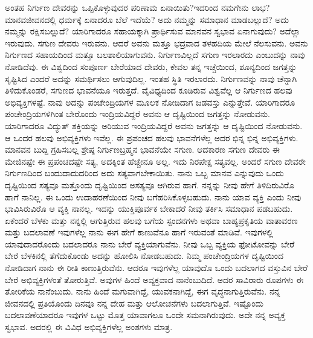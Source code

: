ಅಂತಹ ನಿರ್ಗುಣ ದೇವರನ್ನು ಒಪ್ಪಿಕೊಳ್ಳುವುದರ ಪರಿಣಾಮ ಏನಾಯಿತು?\break ಇದರಿಂದ ನಮಗೇನು ಲಾಭ? ಮಾನವಜೀವನದಲ್ಲಿ ಧರ್ಮಕ್ಕೆ ಏನಾದರೂ ಬೆಲೆ ಇದೆಯೆ? ಅದು ನಮ್ಮನ್ನು ಸಮಾಧಾನ ಮಾಡಬಲ್ಲುದೆ? ಅದು ನಮ್ಮನ್ನು ರಕ್ಷಿಸಬಲ್ಲುದೆ? ಯಾರಿಗಾದರೂ ಸಹಾಯಕ್ಕಾಗಿ ಪ್ರಾರ್ಥಿಸುವ ಮಾನವನ ಸ್ವಭಾವ ಏನಾಗುವುದು? ಅದೆಲ್ಲಾ ಇರುವುದು. ಸಗುಣ ದೇವರು ಇರುವನು. ಆದರೆ ಅವನು ಮತ್ತೂ ಭದ್ರವಾದ ತಳಹದಿಯ ಮೇಲೆ ನೆಲಸುವನು. ಅವನು ನಿರ್ಗುಣದ ಸಹಾಯದಿಂದ ಮತ್ತೂ ಬಲಶಾಲಿಯಾಗುವನು. ನಿರ್ಗುಣವಿಲ್ಲದೆ ಸಗುಣ ಇರಲಾರದು ಎಂಬುದನ್ನು ನಾವು ನೋಡಿದೆವು. ಈ ವಿಶ್ವದಿಂದ ಸಂಪೂರ್ಣ ಬೇರೆಯಾದ ದೇವರು, ಕೇವಲ ತನ್ನ ಇಚ್ಚೆಯಿಂದ, ಶೂನ್ಯದಿಂದ ಜಗತ್ತನ್ನು ಸೃಷ್ಟಿಸಿದ ಎಂದರೆ ಅದನ್ನು ಸಮರ್ಥಿಸಲು ಆಗುವುದಿಲ್ಲ. ಇಂತಹ ಸ್ಥಿತಿ ಇರಲಾರದು. ನಿರ್ಗುಣವನ್ನು ನಾವು ಚೆನ್ನಾಗಿ ತಿಳಿದುಕೊಂಡರೆ, ಸಗುಣದ ಭಾವನೆಯೂ ಇರುತ್ತದೆ. ವೈವಿಧ್ಯದಿಂದ ಕೂಡಿರುವ ವಿಶ್ವವೆಲ್ಲ ಆ ನಿರ್ಗುಣದ ಹಲವು ಅಭಿವ್ಯಕ್ತಿಗಳಷ್ಟೆ. ನಾವು ಅದನ್ನು ಪಂಚೇಂದ್ರಿಯಗಳ ಮೂಲಕ ನೋಡಿದಾಗ ಜಡವಸ್ತು ಎನ್ನುತ್ತೇವೆ. ಯಾರಿಗಾದರೂ ಪಂಚೇಂದ್ರಿಯಗಳಿಗಿಂತ ಬೇರೊಂದು ಇಂದ್ರಿಯವಿದ್ದರೆ ಅವನು ಆ ದೃಷ್ಟಿಯಿಂದ ಜಗತ್ತನ್ನು ನೋಡುವನು. ಯಾರಿಗಾದರೂ ವಿದ್ಯುತ್ ಶಕ್ತಿಯನ್ನು ಅರಿಯುವ ಇಂದ್ರಿಯವಿದ್ದರೆ ಅವನು ಜಗತ್ತನ್ನು ಆ ದೃಷ್ಟಿಯಿಂದ ನೋಡುವನು. ಆ ಒಂದರ ಹಲವು ಅಭಿವ್ಯಕ್ತಿಗಳು ಇವೆಲ್ಲ. ಈ ಪ್ರಪಂಚದ ಹಲವು ಭಾವನೆಗಳೆಲ್ಲ ಅದರ ಭಿನ್ನ ಭಿನ್ನ ಅಭಿವ್ಯಕ್ತಿಗಳು. ಮಾನವನ ಬುದ್ದಿ ಗ್ರಹಿಸಬಲ್ಲ ಶ್ರೇಷ್ಠ ನಿರ್ಗುಣಬ್ರಹ್ಮನ ಭಾವನೆಯೇ ಸಗುಣ. ಆದಕಾರಣ ಸಗುಣ ದೇವರು ಈ ಮೇಜಿನಷ್ಟೇ ಈ ಪ್ರಪಂಚದಷ್ಟೇ ಸತ್ಯ, ಅದಕ್ಕಿಂತ ಹೆಚ್ಚೇನೂ ಅಲ್ಲ. ಇದು ನಿರಪೇಕ್ಷ ಸತ್ಯವಲ್ಲ. ಅಂದರೆ ಸಗುಣ ದೇವರೇ ನಿರ್ಗುಣದಿಂದ ಬಂದುದಾದುದರಿಂದ ಅದು ಸತ್ಯವಾಗಬೇಕಾಯಿತು. ನಾನು ಒಬ್ಬ ಮಾನವ ಎನ್ನುವುದು ಒಂದು ದೃಷ್ಟಿಯಿಂದ ಸತ್ಯವೂ ಮತ್ತೊಂದು ದೃಷ್ಟಿಯಿಂದ ಅಸತ್ಯವೂ ಆಗಿರುವ ಹಾಗೆ. ನನ್ನನ್ನು ನೀವು ಹೇಗೆ ತಿಳಿದಿರುವಿರೊ ಹಾಗೆ ನಾನಿಲ್ಲ. ಈ ಒಂದು ಉದಾಹರಣೆಯಿಂದ ನೀವು ಬಗೆಹರಿಸಿಕೊಳ್ಳಬಹುದು. ನಾನು ಯಾವ ವ್ಯಕ್ತಿ ಎಂದು ನೀವು ಭಾವಿಸಿರುವಿರೊ ಆ ವ್ಯಕ್ತಿ ನಾನಲ್ಲ. ಇದನ್ನು ಯುಕ್ತಿಪೂರ್ವಕ ಬೇಕಾದರೆ ನೀವು ತರ್ಕಿಸಿ ಸಮಾಧಾನ ಪಡಬಹುದು. ಏಕೆಂದರೆ ಬೆಳಕು ಮತ್ತು ನನ್ನಲ್ಲಿ ಆಗುತ್ತಿರುವ ಹಲವು ಬಗೆಯ ಸ್ಪಂದನಗಳು ಅಥವಾ ಬಾಹ್ಯಪ್ರಕೃತಿಯ ವಾತಾವರಣ ಮತ್ತು ಬದಲಾವಣೆ ಇವುಗಳೆಲ್ಲ ನಾನು ಈಗ ಹೇಗೆ ಕಾಣುವೆನೂ ಹಾಗೆ ಇರುವಂತೆ ಮಾಡಿವೆ. ಇವುಗಳಲ್ಲಿ ಯಾವುದಾದರೊಂದು ಬದಲಾದರೂ ನಾನು ಬೇರೆ ವ್ಯಕ್ತಿಯಾಗುವೆನು. ನೀವು ಒಬ್ಬ ವ್ಯಕ್ತಿಯ ಫೋಟೋವನ್ನು ಬೇರೆ ಬೇರೆ ಬೆಳಕಿನಲ್ಲಿ ತೆಗೆದುಕೊಂಡು ಅದನ್ನು ಹೋಲಿಸಿ ನೋಡಬಹುದು. ನಿಮ್ಮ ಪಂಚೇಂದ್ರಿಯಗಳ ದೃಷ್ಟಿಯಿಂದ ನೋಡಿದಾಗ ನಾನು ಈ ರೀತಿ ಕಾಣುತ್ತಿರುವೆನು. ಆದರೂ ಇವುಗಳೆಲ್ಲ ಯಾವುದೊ ಒಂದು ಬದಲಾಗದ ವಸ್ತುವಿನ ಬೇರೆ ಬೇರೆ ಅಭಿವ್ಯಕ್ತಿಗಳಂತೆ ತೋರುತ್ತಿವೆ. ಅವುಗಳ ಹಿಂದೆ ಅವ್ಯಕ್ತವಾದ ನಾನೆಂಬುದಿದೆ. ಅದರ ಸಾವಿರಾರು ರೂಪಗಳು ಈ ತೋರಿಕೆಯ ನಾನೆಂಬುದು. ನಾನು ಹಿಂದೆ ಮಗುವಾಗಿದ್ದೆ, ಯುವಕನಾಗಿದ್ದೆ, ಈಗ ವೃದ್ಧನಾಗುತ್ತಿರುವೆನು. ನನ್ನ ಜೀವನದಲ್ಲಿ ಪ್ರತಿಯೊಂದು ದಿನವೂ ನನ್ನ ದೇಹ ಮತ್ತು ಆಲೋಚನೆಗಳು ಬದಲಾಗುತ್ತಿವೆ. ಇಷ್ಟೊಂದು ಬದಲಾವಣೆಯಾದರೂ ಇವುಗಳ ಒಟ್ಟು ಮೊತ್ತ ಯಾವಾಗಲೂ ಒಂದೇ ಸಮನಾಗಿರುವುದು. ಅದೇ ನನ್ನ ಅವ್ಯಕ್ತ ಸ್ವಭಾವ. ಅದರಲ್ಲಿ ಈ ವಿವಿಧ ಅಭಿವ್ಯಕ್ತಿಗಳೆಲ್ಲ ಅಂಶಗಳು ಮಾತ್ರ.

